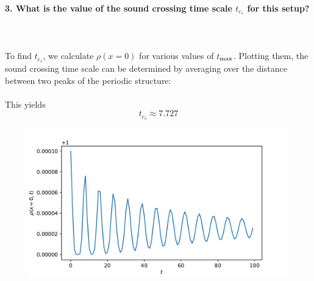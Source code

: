 \paragraph{3. What is the value of the sound crossing 
    time scale $t_{c_s}$ for this setup?
} \ \\
    \\
    To find $t_{c_s}$, we calculate $\rho(x=0)$ for 
    various values of $t_\textnormal{max}$. Plotting them,
    the sound crossing time scale can be determined by 
    averaging over the distance between two peaks of 
    the periodic structure: \\
     \ \\
    This yields
    $$t_{c_s}\approx7.727$$
    \begin{figure}[h!]
        \centering
        \includegraphics[width=.7\textwidth]{../figures/sound_crossing_time_scale.pdf}
    \end{figure} 

